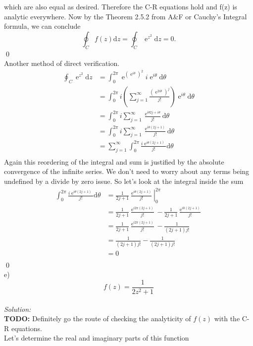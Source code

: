 \documentclass[10pt]{amsart}
\newcommand{\D}{\mathrm{d}}
\DeclareMathOperator{\E}{e}
\theoremstyle{nonumberplain}
\begin{document}
\begin{enumerate}[label={\bf {\arabic*}:}]
which are also equal as desired.
Therefore the C-R equations hold and f(z) is analytic everywhere.
Now by the Theorem 2.5.2 from A\&F or Cauchy's Integral formula, we can conclude
$$
\oint_C f(z)\D z = \oint_C \E^{z^2} \D z = 0.
$$
\qed 
\\
Another method of direct verification.
\begin{align*}
\oint_C \E^{z^2} \D z  &= \int_{0}^{2\pi} \E^{ \left( \E^{i\theta}\right)^2} i \E^{i \theta}\D \theta \\
	&= \int_{0}^{2\pi}i \left( \sum_{j=1}^{\infty} \frac{\left(\E^{2i\theta}\right)^j} {j!} \right) \E^{i \theta}\D \theta \\
	&= \int_{0}^{2\pi}i \sum_{j=1}^{\infty} \frac{\E^{i\theta2j + i \theta}} {j!} \D \theta \\
	&= \int_{0}^{2\pi}i \sum_{j=1}^{\infty} \frac{\E^{i\theta\left(2j + 1 \right)}} {j!} \D \theta \\
	&= \sum_{j=1}^{\infty}  \int_{0}^{2\pi}\frac{i\E^{i\theta\left(2j + 1 \right)}} {j!} \D \theta \\
\end{align*}
Again this reordering of the integral and sum is justified by the absolute convergence of the infinite series. We don't need to worry about any terms being undefined by a divide by zero issue. So let's look at the integral inside the sum
\begin{align*}
\int_{0}^{2\pi}\frac{i\E^{i\theta\left(2j + 1 \right)}} {j!} \D \theta
	&= \left. \frac{1}{2j + 1} \frac{\E^{i\theta\left(2j + 1 \right)}} {j!} \right|_0^{2\pi} \\
	&= \frac{1}{2j + 1} \frac{\E^{i2\pi\left(2j + 1 \right)}} {j!}  - \frac{1}{2j + 1} \frac{\E^{i0\left(2j + 1 \right)}} {j!} \\
	&= \frac{1}{2j + 1} \frac{\E^{i2\pi\left(2j + 1 \right)}} {j!}  - \frac{1}{\left(2j + 1\right)j!} \\
	&= \frac{1}{\left(2j + 1\right)j!}  - \frac{1}{\left(2j + 1\right)j!} \\
	&= 0 \\
\end{align*}
\qed
\\
e) $$f(z) = \frac{1}{2z^2 + 1} $$ \\
\textit{Solution:} \\
\textbf{TODO:} Definitely go the route of checking the analyticity of $f(z)$ with the C-R equations. \\
Let's determine the real and imaginary parts of this function
\begin{align*}

\end{align*}
\end{enumerate}
\end{document}
